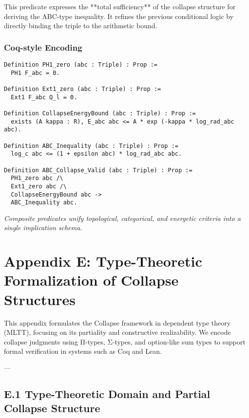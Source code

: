 \documentclass[11pt]{article}
\begin{document}
This predicate expresses the **total sufficiency** of the collapse structure for deriving the ABC-type inequality.  
It refines the previous conditional logic by directly binding the triple to the arithmetic bound.

\subsubsection*{Coq-style Encoding}

\begin{lstlisting}
Definition PH1_zero (abc : Triple) : Prop :=
  PH1 F_abc = 0.

Definition Ext1_zero (abc : Triple) : Prop :=
  Ext1 F_abc Q_l = 0.

Definition CollapseEnergyBound (abc : Triple) : Prop :=
  exists (A kappa : R), E_abc abc <= A * exp (-kappa * log_rad_abc abc).

Definition ABC_Inequality (abc : Triple) : Prop :=
  log_c abc <= (1 + epsilon abc) * log_rad_abc abc.

Definition ABC_Collapse_Valid (abc : Triple) : Prop :=
  PH1_zero abc /\
  Ext1_zero abc /\
  CollapseEnergyBound abc ->
  ABC_Inequality abc.
\end{lstlisting}

\begin{center}
\textit{Composite predicates unify topological, categorical, and energetic criteria into a single implication schema.}
\end{center}



\section*{Appendix E: Type-Theoretic Formalization of Collapse Structures}

This appendix formulates the Collapse framework in dependent type theory (MLTT),  
focusing on its partiality and constructive realizability. We encode collapse judgments using  
Π-types, Σ-types, and option-like sum types to support formal verification in systems such as Coq and Lean.

---

\subsection*{E.1 Type-Theoretic Domain and Partial Collapse Structure}
\end{document}
